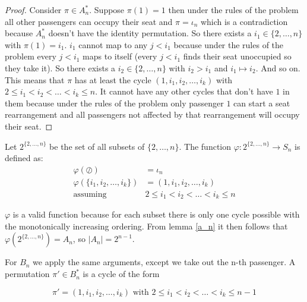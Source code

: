 \begin{proof}

Consider $\pi \in A_n^*$. Suppose $\pi(1) = 1$ then under the rules of the problem all other passengers can occupy their seat and $\pi =\iota_n$ which is a contradiction because $A_n^*$ doesn't have the identity permutation. So there exists a $i_1 \in \{2,\ldots,n\}$ with $\pi(1) = i_1$.  $i_1$ cannot map to any $j  <  i_1$ because under the rules of the problem every $j  < i_1$ maps to itself (every $j < i_1$ finds their seat unoccupied so they take it). So there exists a $i_2 \in \{2,\ldots,n\}$ with $i_2 >i_1$ and $i_1 \mapsto i_2$. And so on. This means that $\pi$ has at least the cycle $(1, i_1, i_2,\ldots, i_k)$ with $2 \leq i_1 < i_2 < \ldots < i_k \leq n$. It cannot have any other cycles that don't have $1$ in them because under the rules of the problem only passenger $1$ can start a seat rearrangement and all passengers not affected by that rearrangement will occupy their seat. 

\end{proof}

\begin{defn}\label{func}
Let $2^{\{2,\ldots,n\}}$ be the set of all subsets of $\{2,\ldots,n\}$. The function $\varphi: 2^{\{2,\ldots,n\}} \rightarrow S_n$ is defined as:
\begin{equation*}
    \begin{split}
        \varphi(\oslash) & = \iota_n \\
        \varphi(\{i_1, i_2,\ldots, i_k\}) & =  (1, i_1, i_2,\ldots, i_k) \\
             \text{assuming } & 2 \leq i_1 < i_2 < \ldots < i_k \leq n
    \end{split}
\end{equation*}
\end{defn}

$\varphi$ is a valid function because for each subset there is only one cycle possible with the monotonically increasing ordering. From lemma \ref{a_n} it then follows that  $\varphi(2^{\{2,\ldots,n\}}) = A_n$, so $|A_n| = 2^{n -1}$.

For $B_n$ we apply the same arguments, except we take out the n-th passenger. A permutation $\pi' \in B_n^*$ is a cycle of the form

\begin{equation*}
\pi' = (1, i_1, i_2,\ldots, i_k)  \text{ with } 2 \leq i_1 < i_2 < \ldots < i_k \leq n -1
\end{equation*}  

